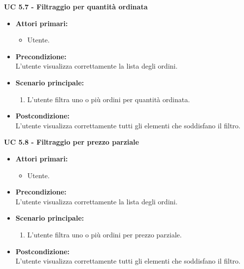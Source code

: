 \vspace{0.4cm}

\noindent \textbf{\large UC 5.7 - Filtraggio per quantità ordinata}
\label{uc:filtraggio-quantita-ordinata}
\begin{itemize}

	\item \textbf{Attori primari: }
		\begin{itemize}
			\item Utente.
		\end{itemize}

	\item \textbf{Precondizione: }\\[0.3cm]
		L'utente visualizza correttamente la lista degli ordini.

	\item \textbf{Scenario principale: }
		\begin{enumerate}
			\item L'utente filtra uno o più ordini per quantità ordinata.
		\end{enumerate}
		

	\item \textbf{Postcondizione: }\\[0.3cm]
		L'utente visualizza correttamente tutti gli elementi che soddisfano il filtro.

\end{itemize}

\vspace{0.4cm}

\noindent \textbf{\large UC 5.8 - Filtraggio per prezzo parziale}
\label{uc:filtraggio-prezzo-parziale-ord}
\begin{itemize}

	\item \textbf{Attori primari: }
		\begin{itemize}
			\item Utente.
		\end{itemize}

	\item \textbf{Precondizione: }\\[0.3cm]
		L'utente visualizza correttamente la lista degli ordini.

	\item \textbf{Scenario principale: }
		\begin{enumerate}
			\item L'utente filtra uno o più ordini per prezzo parziale.
		\end{enumerate}
		

	\item \textbf{Postcondizione: }\\[0.3cm]
		L'utente visualizza correttamente tutti gli elementi che soddisfano il filtro.

\end{itemize}

